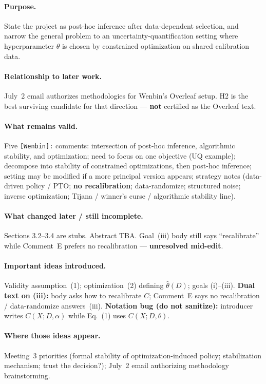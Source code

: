 \documentclass[11pt]{article}
\begin{document}
\paragraph{Purpose.}
State the project as post-hoc inference after data-dependent selection,
and narrow the general problem to an uncertainty-quantification setting where hyperparameter
$\theta$ is chosen by constrained optimization on shared calibration data.

\paragraph{Relationship to later work.}
July~2 email authorizes methodologies for Wenbin's Overleaf setup. H2 is the best surviving
candidate for that direction --- \textbf{not} certified as the Overleaf text.

\paragraph{What remains valid.}
Five \texttt{[Wenbin]:} comments: intersection of post-hoc inference, algorithmic stability, and optimization;
need to focus on one objective (UQ example); decompose into stability of constrained
optimizations, then post-hoc inference; setting may be modified if a more principal version
appears; strategy notes (data-driven policy / PTO; \textbf{no recalibration}; data-randomize;
structured noise; inverse optimization; Tijana / winner's curse / algorithmic stability line).

\paragraph{What changed later / still incomplete.}
Sections 3.2--3.4 are stubs. Abstract TBA. Goal~(iii) body still says ``recalibrate'' while
Comment~E prefers no recalibration --- \textbf{unresolved mid-edit}.

\paragraph{Important ideas introduced.}
Validity assumption~(1); optimization~(2) defining $\hat\theta(D)$; goals (i)--(iii).
\textbf{Dual text on (iii):} body asks how to recalibrate $C$; Comment~E says no recalibration /
data-randomize answers~(iii).
\textbf{Notation bug (do not sanitize):} introducer writes $C(X;D,\alpha)$ while Eq.~(1) uses
$C(X;D,\theta)$.

\paragraph{Where those ideas appear.}
Meeting~3 priorities (formal stability of optimization-induced policy; stabilization
mechanism; trust the decision?); July~2 email authorizing methodology brainstorming.
\end{document}

